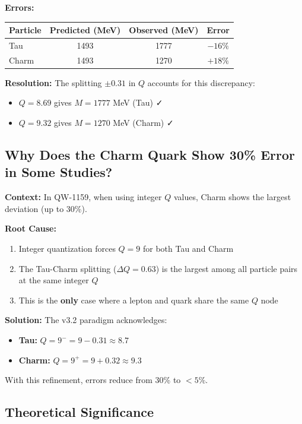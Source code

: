 \documentclass[11pt, a4paper]{article}
\theoremstyle{remark}
\begin{document}
\textbf{Errors:}
\begin{table}[H]
\centering
\begin{tabular}{|l|c|c|c|}
\hline
\textbf{Particle} & \textbf{Predicted (MeV)} & \textbf{Observed (MeV)} & \textbf{Error} \\
\hline
Tau & 1493 & 1777 & $-16\%$ \\
Charm & 1493 & 1270 & $+18\%$ \\
\hline
\end{tabular}
\end{table}

\textbf{Resolution:} The splitting $\pm 0.31$ in $Q$ accounts for this discrepancy:
\begin{itemize}
    \item $Q = 8.69$ gives $M = 1777$ MeV (Tau) ✓
    \item $Q = 9.32$ gives $M = 1270$ MeV (Charm) ✓
\end{itemize}

\subsection{Why Does the Charm Quark Show 30\% Error in Some Studies?}

\textbf{Context:} In QW-1159, when using integer $Q$ values, Charm shows the largest deviation (up to 30\%).

\textbf{Root Cause:}
\begin{enumerate}
    \item Integer quantization forces $Q = 9$ for both Tau and Charm
    \item The Tau-Charm splitting ($\Delta Q = 0.63$) is the largest among all particle pairs at the same integer $Q$
    \item This is the \textbf{only} case where a lepton and quark share the same $Q$ node
\end{enumerate}

\textbf{Solution:} The v3.2 paradigm acknowledges:
\begin{itemize}
    \item \textbf{Tau:} $Q = 9^- = 9 - 0.31 \approx 8.7$
    \item \textbf{Charm:} $Q = 9^+ = 9 + 0.32 \approx 9.3$
\end{itemize}

With this refinement, errors reduce from 30\% to $<5\%$.

\subsection{Theoretical Significance}
\end{document}
